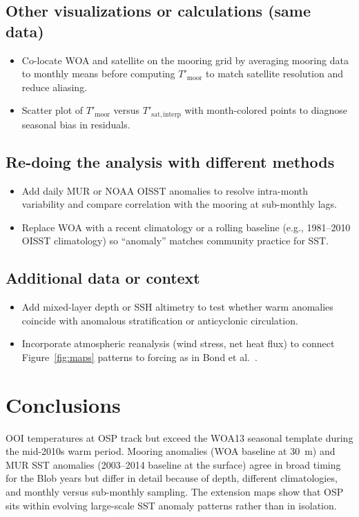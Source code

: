 \documentclass[11pt,letterpaper]{article}
\begin{document}
\subsection*{Other visualizations or calculations (same data)}
\begin{itemize}
  \item Co-locate WOA and satellite on the mooring grid by averaging mooring data to monthly means before computing $T'_{\mathrm{moor}}$ to match satellite resolution and reduce aliasing.
  \item Scatter plot of $T'_{\mathrm{moor}}$ versus $T'_{\mathrm{sat,interp}}$ with month-colored points to diagnose seasonal bias in residuals.
\end{itemize}

\subsection*{Re-doing the analysis with different methods}
\begin{itemize}
  \item Add daily MUR or NOAA OISST anomalies to resolve intra-month variability and compare correlation with the mooring at sub-monthly lags.
  \item Replace WOA with a recent climatology or a rolling baseline (e.g., 1981--2010 OISST climatology) so ``anomaly'' matches community practice for SST.
\end{itemize}

\subsection*{Additional data or context}
\begin{itemize}
  \item Add mixed-layer depth or SSH altimetry to test whether warm anomalies coincide with anomalous stratification or anticyclonic circulation.
  \item Incorporate atmospheric reanalysis (wind stress, net heat flux) to connect Figure~\ref{fig:maps} patterns to forcing as in Bond et al.\ \cite{bond2015}.
\end{itemize}

\section{Conclusions}
OOI temperatures at OSP track but exceed the WOA13 seasonal template during the mid-2010s warm period. Mooring anomalies (WOA baseline at \SI{30}{\meter}) and MUR SST anomalies (2003--2014 baseline at the surface) agree in broad timing for the Blob years but differ in detail because of depth, different climatologies, and monthly versus sub-monthly sampling. The extension maps show that OSP sits within evolving large-scale SST anomaly patterns rather than in isolation.
\end{document}
